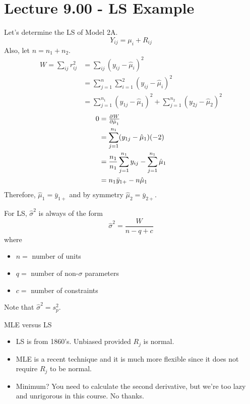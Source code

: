 \section{Lecture 9.00 - LS Example}
Let's determine the LS of Model 2A.
\[ Y_{ij}=\mu_i+R_{ij} \]
Also, let $ n=n_1+n_2 $.
\begin{align*}
    W=\sum_{ij}r_{ij}^2
     & =\sum_{ij}(y_{ij}-\hat{\mu}_i)^2                                                  \\
     & =\sum_{j=1}^{n} \sum_{i=1}^{2} (y_{ij}-\hat{\mu}_i)^2                             \\
     & =\sum_{j=1}^{n_1}(y_{1j}-\hat{\mu}_1)^2 + \sum_{j=1}^{n_2} (y_{2j}-\hat{\mu}_2)^2
\end{align*}
\begin{align*}
    0 & =\pd{W}{\hat{\mu}_1}                                                 \\
      & =\sum_{j=1}^{n_1} (y_{1j}-\hat{\mu}_1)(-2)                           \\
      & =\frac{n_1}{n_1} \sum_{j=1}^{n_1} y_{ij}-\sum_{j=1}^{n_1}\hat{\mu}_1 \\
      & =n_1\bar{y}_{1+}-n\hat{\mu}_1                                        \\
\end{align*}
Therefore, $ \hat{\mu}_1=\bar{y}_{1+} $ and by symmetry $ \hat{\mu}_2=\bar{y}_{2+} $.
\begin{Remark}{}{}
    For LS, $ \hat{\sigma}^2 $ is always of the form
    \[ \hat{\sigma}^2=\frac{W}{n-q+c} \]
    where
    \begin{itemize}
        \item $ n= $ number of units
        \item $ q= $ number of non-$ \sigma $ parameters
        \item $ c= $ number of constraints
    \end{itemize}
    Note that $ \hat{\sigma}^2=s_p^2 $.
\end{Remark}
\begin{Remark}{MLE versus LS}{}
    \begin{itemize}
        \item LS is from 1860's. Unbiased provided $ R_j $ is normal.
        \item MLE is a recent technique and it is much more flexible
              since it does not require $ R_j $ to be normal.
        \item Minimum? You need to calculate the second derivative,
              but we're too lazy and unrigorous in this course. No thanks.
    \end{itemize}
\end{Remark}

